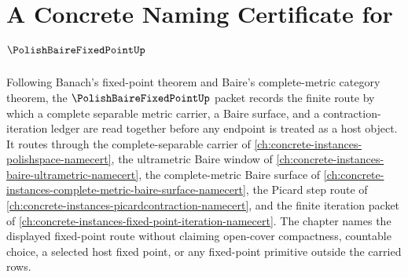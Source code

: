 \chapter{A Concrete Naming Certificate for $\PolishBaireFixedPointUp$}
\label{ch:concrete-instances-polish-baire-fixed-point-namecert}

Following Banach's fixed-point theorem and Baire's complete-metric category theorem, the $\PolishBaireFixedPointUp$ packet records the finite route by which a complete separable metric carrier, a Baire surface, and a contraction-iteration ledger are read together before any endpoint is treated as a host object. It routes through the complete-separable carrier of \autoref{ch:concrete-instances-polishspace-namecert}, the ultrametric Baire window of \autoref{ch:concrete-instances-baire-ultrametric-namecert}, the complete-metric Baire surface of \autoref{ch:concrete-instances-complete-metric-baire-surface-namecert}, the Picard step route of \autoref{ch:concrete-instances-picardcontraction-namecert}, and the finite iteration packet of \autoref{ch:concrete-instances-fixed-point-iteration-namecert}. The chapter names the displayed fixed-point route without claiming open-cover compactness, countable choice, a selected host fixed point, or any fixed-point primitive outside the carried rows.

